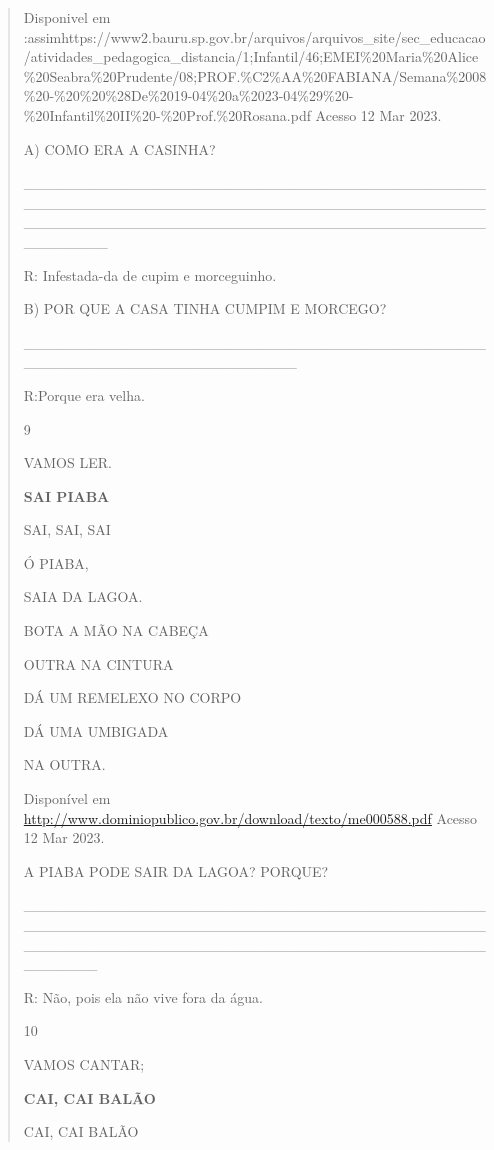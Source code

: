 \begin{verse}
{Disponivel em
:assimhttps://www2.bauru.sp.gov.br/arquivos/arquivos\_site/sec\_educacao/atividades\_pedagogica\_distancia/1;Infantil/46;EMEI\%20Maria\%20Alice\%20Seabra\%20Prudente/08;PROF.\%C2\%AA\%20FABIANA/Semana\%2008\%20-\%20\%20\%28De\%2019-04\%20a\%2023-04\%29\%20-\%20Infantil\%20II\%20-\%20Prof.\%20Rosana.pdf
Acesso 12 Mar 2023.

A) COMO ERA A CASINHA?

\_\_\_\_\_\_\_\_\_\_\_\_\_\_\_\_\_\_\_\_\_\_\_\_\_\_\_\_\_\_\_\_\_\_\_\_\_\_\_\_\_\_\_\_\_\_\_\_\_\_\_\_\_\_\_\_\_\_\_\_\_\_\_\_\_\_\_\_\_\_\_\_\_\_\_\_\_\_\_\_\_\_\_\_\_\_\_\_\_\_\_\_\_\_\_\_\_\_\_\_\_\_\_\_\_\_\_\_\_\_\_\_\_\_\_\_\_\_\_\_\_\_\_\_\_\_\_\_\_\_\_\_\_\_\_\_\_\_\_\_

R: Infestada-da de cupim e morceguinho.

B) POR QUE A CASA TINHA CUMPIM E MORCEGO?

\_\_\_\_\_\_\_\_\_\_\_\_\_\_\_\_\_\_\_\_\_\_\_\_\_\_\_\_\_\_\_\_\_\_\_\_\_\_\_\_\_\_\_\_\_\_\_\_\_\_\_\_\_\_\_\_\_\_\_\_\_\_\_\_\_\_\_\_\_\_

R:Porque era velha.

\num{9}

VAMOS LER.

\textbf{SAI PIABA}

SAI, SAI, SAI

Ó PIABA,

SAIA DA LAGOA.

BOTA A MÃO NA CABEÇA

OUTRA NA CINTURA

DÁ UM REMELEXO NO CORPO

DÁ UMA UMBIGADA

NA OUTRA.

Disponível em
\url{http://www.dominiopublico.gov.br/download/texto/me000588.pdf}
Acesso 12 Mar 2023.

A PIABA PODE SAIR DA LAGOA? PORQUE?

\_\_\_\_\_\_\_\_\_\_\_\_\_\_\_\_\_\_\_\_\_\_\_\_\_\_\_\_\_\_\_\_\_\_\_\_\_\_\_\_\_\_\_\_\_\_\_\_\_\_\_\_\_\_\_\_\_\_\_\_\_\_\_\_\_\_\_\_\_\_\_\_\_\_\_\_\_\_\_\_\_\_\_\_\_\_\_\_\_\_\_\_\_\_\_\_\_\_\_\_\_\_\_\_\_\_\_\_\_\_\_\_\_\_\_\_\_\_\_\_\_\_\_\_\_\_\_\_\_\_\_\_\_\_\_\_\_\_\_

R: Não, pois ela não vive fora da água.

\num{10}

VAMOS CANTAR;

\textbf{CAI, CAI BALÃO}

CAI, CAI BALÃO

}
\end{verse}
